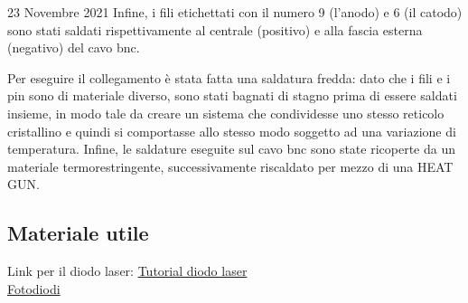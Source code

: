 \documentclass{article}
\numberwithin{equation}{section}
\begin{document}
\begin{section}{23 Novembre 2021}
Infine, i fili etichettati con il numero 9 (l'anodo) e 6 (il catodo) sono stati saldati rispettivamente al centrale (positivo) e alla fascia esterna (negativo) del cavo bnc.

Per eseguire il collegamento è stata fatta una saldatura fredda: dato che i fili e i pin sono di materiale diverso, sono stati bagnati di stagno prima di essere saldati insieme, in modo tale da creare un sistema che condividesse uno stesso reticolo cristallino e quindi si comportasse allo stesso modo soggetto ad una variazione di temperatura. Infine, le saldature eseguite sul cavo bnc sono state ricoperte da un materiale termorestringente, successivamente riscaldato per mezzo di una HEAT GUN. 
\subsection{Materiale utile}
Link per il diodo laser:
\href{https://www.thorlabs.com/newgrouppage9.cfm?objectgroup_id=1832}{Tutorial diodo laser}\\
\href{https://www.thorlabs.com/newgrouppage9.cfm?objectgroup_id=285}{Fotodiodi}\\

\end{section}
\end{document}
